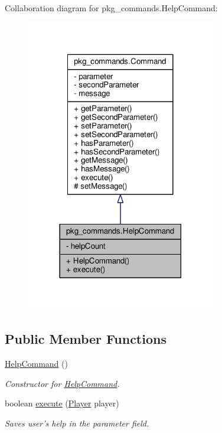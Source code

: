 Collaboration diagram for pkg\-\_\-commands.\-Help\-Command\-:
\nopagebreak
\begin{figure}[H]
\begin{center}
\leavevmode
\includegraphics[width=234pt]{classpkg__commands_1_1HelpCommand__coll__graph}
\end{center}
\end{figure}
\subsection*{Public Member Functions}
\begin{DoxyCompactItemize}
\item 
\hyperlink{classpkg__commands_1_1HelpCommand_a5f12eadc1835cd0c7cdb77811b5fb756}{Help\-Command} ()
\begin{DoxyCompactList}\small\item\em Constructor for \hyperlink{classpkg__commands_1_1HelpCommand}{Help\-Command}. \end{DoxyCompactList}\item 
boolean \hyperlink{classpkg__commands_1_1HelpCommand_a332d3e57539dfc82f8c539f8b3e24dd6}{execute} (\hyperlink{classpkg__world_1_1Player}{Player} player)
\begin{DoxyCompactList}\small\item\em Saves user's help in the parameter field. \end{DoxyCompactList}\end{DoxyCompactItemize}
